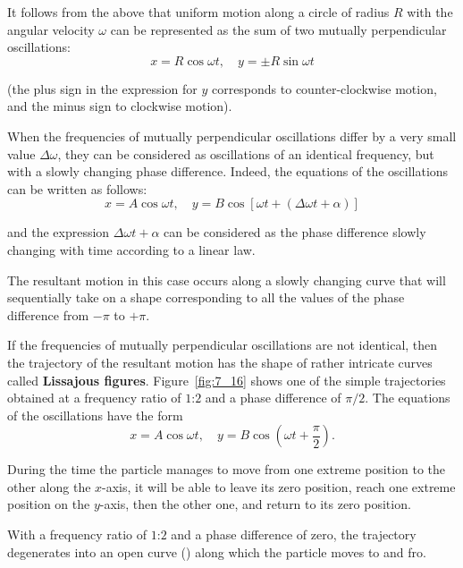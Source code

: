 It follows from the above that uniform motion along a circle of radius $R$ with the angular velocity $\omega$ can be represented as the sum of two mutually perpendicular oscillations:
\begin{equation}\label{eq:7_97}
	x = R\cos\omega t,\quad y = \pm R\sin\omega t
\end{equation}

\noindent
(the plus sign in the expression for $y$ corresponds to counter-clockwise motion, and the minus sign to clockwise motion).

When the frequencies of mutually perpendicular oscillations differ by a very small value $\Delta\omega$, they can be considered as oscillations of an identical frequency, but with a slowly changing phase difference. Indeed, the equations of the oscillations can be written as follows:
\begin{equation*}
	x = A\cos\omega t,\quad y = B\cos[\omega t + (\Delta\omega t + \alpha)]
\end{equation*}

\noindent
and the expression $\Delta\omega t + \alpha$ can be considered as the phase difference slowly changing with time according to a linear law.

The resultant motion in this case occurs along a slowly changing curve that will sequentially take on a shape corresponding to all the values of the phase difference from $-\pi$ to $+\pi$.

If the frequencies of mutually perpendicular oscillations are not identical, then the trajectory of the resultant motion has the shape of rather intricate curves called \textbf{Lissajous figures}. Figure~\ref{fig:7_16} shows one of the simple trajectories obtained at a frequency ratio of $1$:$2$ and a phase difference of $\pi/2$. The equations of the oscillations have the form
\begin{equation*}
	x = A\cos\omega t,\quad y = B\cos\left(\omega t + \frac{\pi}{2}\right).
\end{equation*}

\noindent
During the time the particle manages to move from one  extreme position to the other along the $x$-axis, it will be able to leave its zero position, reach one extreme position on the $y$-axis, then the other one, and return to its zero position.

With a frequency ratio of $1$:$2$ and a phase difference of zero, the trajectory degenerates into an open curve () along which the particle moves to and fro.

